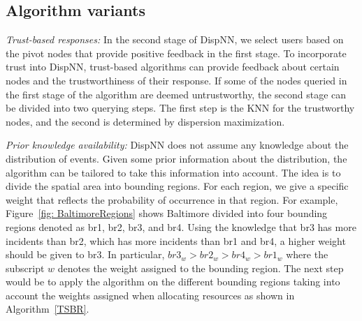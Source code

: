 \documentclass{acm_proc_article-sp}
\begin{document}
\subsection{Algorithm variants}
\textit{Trust-based responses:}
In the second stage of DispNN, we select users based on the pivot nodes that provide positive feedback in the first stage. To incorporate trust into DispNN, trust-based algorithms can provide feedback about certain nodes and the trustworthiness of their response. If some of the nodes queried in the first stage of the algorithm are deemed untrustworthy, the second stage can be divided into two querying steps. The first step is the KNN for the trustworthy nodes, and the second is determined by dispersion maximization. \par

\textit{Prior knowledge availability:}
DispNN does not assume any knowledge about the distribution of events. Given some prior information about the distribution, the algorithm can be tailored to take this information into account. The idea is to divide the spatial area into bounding regions. For each region, we give a specific weight that reflects the probability of occurrence in that region.
For example, Figure~\ref{fig: BaltimoreRegions} shows Baltimore divided into four bounding regions denoted as br1, br2, br3, and br4. Using the knowledge that br3 has more incidents than br2, which has more incidents than br1 and br4, a higher weight should be given to br3. In particular, $br3_w > br2_w> br4_w> br1_w$ where the subscript $w$ denotes the weight assigned to the bounding region. The next step would be to apply the algorithm on the different bounding regions taking into account the weights assigned when allocating resources as shown in Algorithm~\ref{TSBR}.
\end{document}
